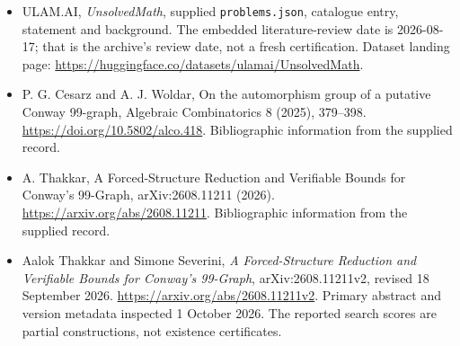 \documentclass[11pt,a4paper]{article}
\begin{document}
{\small

\begin{itemize}

\item[\hypertarget{source:statement:1}{S1}] ULAM.AI, \emph{UnsolvedMath}, supplied \texttt{problems.json}, catalogue entry, statement and background. The embedded literature-review date is 2026-08-17; that is the archive’s review date, not a fresh certification. Dataset landing page: \url{https://huggingface.co/datasets/ulamai/UnsolvedMath}.

\item[\hypertarget{source:statement:2}{S2}] P. G. Cesarz and A. J. Woldar, On the automorphism group of a putative Conway 99-graph, Algebraic Combinatorics 8 (2025), 379–398. \url{https://doi.org/10.5802/alco.418}. Bibliographic information from the supplied record.

\item[\hypertarget{source:statement:3}{S3}] A. Thakkar, A Forced-Structure Reduction and Verifiable Bounds for Conway's 99-Graph, arXiv:2608.11211 (2026). \url{https://arxiv.org/abs/2608.11211}. Bibliographic information from the supplied record.


\item[E1] Aalok Thakkar and Simone Severini,
\emph{A Forced-Structure Reduction and Verifiable Bounds for Conway's
99-Graph}, arXiv:2608.11211v2, revised 18 September 2026.
\url{https://arxiv.org/abs/2608.11211v2}. Primary abstract and version
metadata inspected 1 October 2026. The reported search scores are
partial constructions, not existence certificates.

\end{itemize}

}

\label{end:statement}
\end{document}
